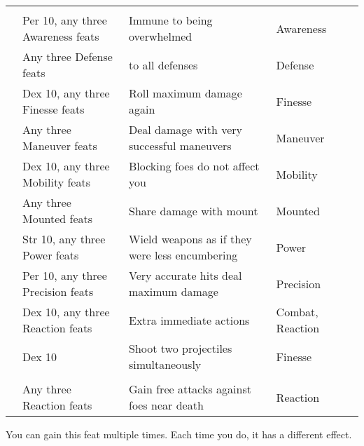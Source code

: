 \begin{longtabuwrapper}
\begin{longtabu}{>{\lcol}p{10em} >{\lcol}p{15em} >{\lcol}X >{\lcol}p{6em} >{\lcol}p{3em}}
        \midrule
         &  &  &  &  \\
         & Per 10, any three Awareness feats & Immune to being overwhelmed & Awareness &  \\
         & Any three Defense feats &  to all defenses & Defense &  \\
         & Dex 10, any three Finesse feats & Roll maximum damage again & Finesse &  \\
         & Any three Maneuver feats & Deal damage with very successful maneuvers & Maneuver &  \\
         & Dex 10, any three Mobility feats & Blocking foes do not affect you & Mobility&  \\
         & Any three Mounted feats & Share damage with mount & Mounted&  \\
         & Str 10, any three Power feats & Wield weapons as if they were less encumbering & Power&  \\
         & Per 10, any three Precision feats & Very accurate hits deal maximum damage & Precision &  \\
         & Dex 10, any three Reaction feats & Extra immediate actions & Combat, Reaction &  \\
         & Dex 10 & Shoot two projectiles simultaneously & Finesse &  \\

        \midrule
         &  &  &  &  \\
         & Any three Reaction feats & Gain free attacks against foes near death & Reaction &  \\
    \end{longtabu}
    \begin{enumerate*}
        \item You can gain this feat multiple times.
            Each time you do, it has a different effect.
    \end{enumerate*}
\end{longtabuwrapper}

